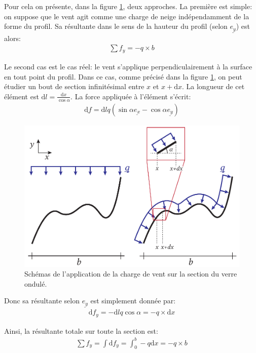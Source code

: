 \documentclass[11pt,titlepage]{article}
\begin{document}
Pour cela on présente, dans la figure \ref{fig:ondul_cas}, deux approches. La première est simple: on suppose que le vent agit comme une charge de neige indépendamment de la forme du profil. Sa résultante dans le sens de la hauteur du profil (selon $\underline{e_y}$) est alors:
\begin{align}
    \sum f_y = -q\times b 
\end{align}

Le second cas est le cas réel: le vent s'applique perpendiculairement à la surface en tout point du profil. Dans ce cas, comme précisé dans la figure \ref{fig:ondul_cas}, on peut étudier un bout de section infinitésimal entre $x$ et $x+\mathrm{d}x$. La longueur de cet élément est $\mathrm{d}l = \frac{\mathrm{d}x}{\cos \alpha}$. La force appliquée à l'élément s'écrit:
\begin{align}
    \underline{\mathrm{d}f} = \mathrm{d}l q \left (\sin \alpha \underline{e_x} - \cos \alpha \underline{e_y}\right )
\end{align}

\begin{figure}
    \centering
\includegraphics[width=0.9\linewidth]{img/ondul/proj_load.pdf}
\caption{Schémas de l'application de la charge de vent sur la section du verre ondulé.}
\label{fig:ondul_cas}
\vspace{10pt}
\end{figure}

Donc sa résultante selon $\underline{e_y}$ est simplement donnée par:
\begin{align}
    \mathrm{d}f_y = - \mathrm{d}l q\cos \alpha = -q \times \mathrm{d}x
\end{align}

Ainsi, la résultante totale sur toute la section est:
\begin{align}
    \sum f_y = \int \mathrm{d}f_y = \int_0^b -q \mathrm{d}x = -q\times b \label{eq:fy}
\end{align}
\end{document}
